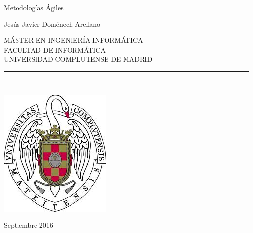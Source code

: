 \newpage

\thispagestyle{empty}

\begin{center}

   \vspace{1cm}

   {\huge Metodolog{\'i}as {\'A}giles}\\[2ex]

   \vspace{0.5cm}

   \vspace{0.5cm}

   {\large Jes\'us Javier Dom\'enech Arellano}\\

   \vspace{0.5cm}

   MÁSTER EN INGENIERÍA INFORMÁTICA \\
   FACULTAD DE INFORMÁTICA\\
   UNIVERSIDAD COMPLUTENSE DE MADRID \\

   \vspace{0.65cm}
   \rule{2in}{0.5pt}\\
   \vspace{0.85cm}

  \includegraphics[height=2.5in]{fig/UCM.jpg}
  
   \vspace{0.5cm}

   \vspace{0.5cm}

  Septiembre 2016\\
   \vspace{1cm}

\end{center}



